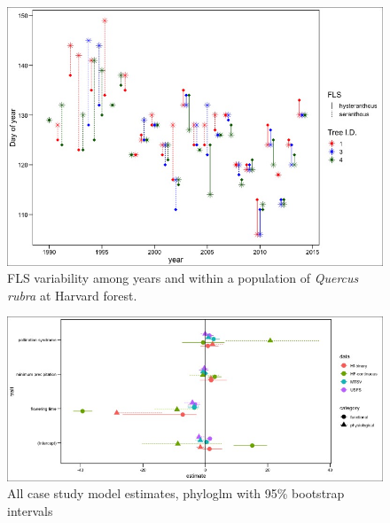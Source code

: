 \documentclass[12pt]{article}\usepackage[]{graphicx}\usepackage[]{color}
\begin{document}
 \begin{figure}
        \centering
          \includegraphics[width=\textwidth]{..//figure/HF_Q_ru_interannual.jpeg}
        \caption{FLS variability among years and within a population of \textit{Quercus rubra} at Harvard forest.}
        \label{fig: Figure 3}
    \end{figure}
  
    \begin{figure}
    \centering
    \includegraphics[width=\textwidth]{..//figure/allcases.jpeg}
    \caption{All case study model estimates, phyloglm with 95\% bootstrap intervals}
    \label{fig:Figure 4}
    \end{figure}
    
\end{document}
